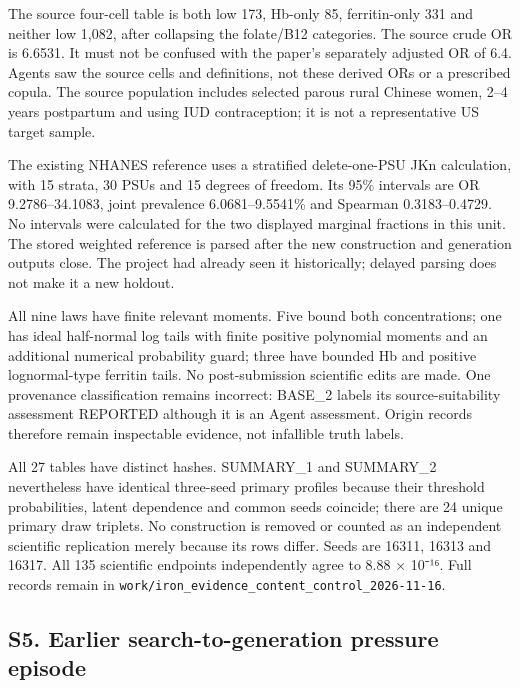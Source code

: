 \documentclass[11pt,letterpaper]{article}
\begin{document}
\endgroup

The source four-cell table is both low 173, Hb-only 85, ferritin-only 331 and neither low 1,082, after collapsing the folate/\allowbreak{}B12 categories. The source crude OR is 6.6531. It must not be confused with the paper's separately adjusted OR of 6.4. Agents saw the source cells and definitions, not these derived ORs or a prescribed copula. The source population includes selected parous rural Chinese women, 2–\allowbreak{}4 years postpartum and using IUD contraception; it is not a representative US target sample.


The existing NHANES reference uses a stratified delete-one-PSU JKn calculation, with 15 strata, 30 PSUs and 15 degrees of freedom. Its 95\% intervals are OR 9.2786–\allowbreak{}34.1083, joint prevalence 6.0681–\allowbreak{}9.5541\% and Spearman 0.3183–\allowbreak{}0.4729. No intervals were calculated for the two displayed marginal fractions in this unit. The stored weighted reference is parsed after the new construction and generation outputs close. The project had already seen it historically; delayed parsing does not make it a new holdout.


All nine laws have finite relevant moments. Five bound both concentrations; one has ideal half-normal log tails with finite positive polynomial moments and an additional numerical probability guard; three have bounded Hb and positive lognormal-type ferritin tails. No post-submission scientific edits are made. One provenance classification remains incorrect: BASE\_2 labels its source-suitability assessment REPORTED although it is an Agent assessment. Origin records therefore remain inspectable evidence, not infallible truth labels.


All 27 tables have distinct hashes. SUMMARY\_1 and SUMMARY\_2 nevertheless have identical three-seed primary profiles because their threshold probabilities, latent dependence and common seeds coincide; there are 24 unique primary draw triplets. No construction is removed or counted as an independent scientific replication merely because its rows differ. Seeds are 16311, 16313 and 16317. All 135 scientific endpoints independently agree to 8.88 × 10⁻¹⁶. Full records remain in \texttt{work/\allowbreak{}iron\_\allowbreak{}evidence\_\allowbreak{}content\_\allowbreak{}control\_\allowbreak{}2026-\allowbreak{}11-\allowbreak{}16}.


\FloatBarrier


\subsection*{S5. Earlier search-to-generation pressure episode}
\end{document}
